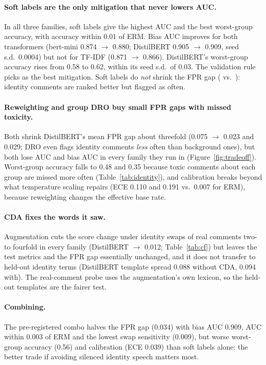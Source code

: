 \paragraph{Soft labels are the only mitigation that never lowers AUC.} In all three families, soft labels give the
highest AUC and the best worst-group accuracy, with accuracy within 0.01 of ERM. Bias AUC improves for both
transformers (bert-mini 0.874 $\rightarrow$ 0.880; DistilBERT 0.905 $\rightarrow$ 0.909, seed s.d.\ 0.0004) but not
for TF-IDF (0.871 $\rightarrow$ 0.866). DistilBERT's worst-group accuracy rises from 0.58 to 0.62, within its seed
s.d.\ of 0.03. The validation rule picks \Best{} as the best mitigation. Soft labels do \emph{not} shrink the FPR gap
(\BertDistilSoftMeanAbsFprGap{} vs.\ \BertDistilErmMeanAbsFprGap{}): identity comments are ranked better but flagged
as often.

\paragraph{Reweighting and group DRO buy small FPR gaps with missed toxicity.} Both shrink DistilBERT's mean FPR gap
about threefold (0.075 $\rightarrow$ 0.023 and 0.029; DRO even flags identity comments \emph{less} often than background
ones), but both lose AUC and bias AUC in every family they run in (Figure~\ref{fig:tradeoff}). Worst-group accuracy
falls to 0.48 and 0.35 because toxic comments about each group are missed more often (Table~\ref{tab:identity}), and
calibration breaks beyond what temperature scaling repairs (ECE 0.110 and 0.191 vs.\ 0.007 for ERM), because
reweighting changes the effective base rate.

\paragraph{CDA fixes the words it saw.} Augmentation cuts the score change under identity swaps of real comments two-
to fourfold in every family (DistilBERT \BertDistilErmCfRealDelta{} $\rightarrow$ 0.012; Table~\ref{tab:cf}) but leaves
the test metrics and the FPR gap essentially unchanged, and it does not transfer to held-out identity terms
(DistilBERT template spread 0.088 without CDA, 0.094 with). The real-comment probe uses the augmentation's own
lexicon, so the held-out templates are the fairer test.

\paragraph{Combining.} The pre-registered combo halves the FPR gap (0.034) with bias AUC 0.909, AUC within 0.003 of
ERM and the lowest swap sensitivity (0.009), but worse worst-group accuracy (0.56) and calibration (ECE 0.039) than soft
labels alone: the better trade if avoiding silenced identity speech matters most.

